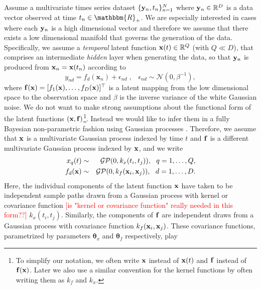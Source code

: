 \documentclass{article} %
\begin{document}
Assume a multivariate times series dataset $\{\mathbf{y}_n,t_n\}_{n=1}^N$
where $\mathbf{y}_n \in \mathbb{R}^D$ is a data vector observed at time 
$t_n \in \mathbbm{R}_+$. We are especially interested in cases where each 
$\mathbf{y}_n$ is a high dimensional vector 
and therefore we assume that there exists a
low dimensional manifold that governs the generation of the data. 
Specifically, we assume a {\em temporal} latent
function $\mathbf{x}(t) \in \mathbb{R}^Q$ (with $Q \ll D$), 
that comprises an intermediate {\em hidden} layer when generating the
data, so that $\mathbf{y}_n$ is produced from $\mathbf{x}_n = \mathbf{x}(t_n)$
according to      
\begin{equation}
\label{generative}
\mathit{y_{nd}} = f_d(\mathbf{x}_n) + \epsilon_{nd} \;, \;\;\; \epsilon_{nd} \sim \mathcal{N}(0, \beta^{-1}),
\end{equation}
where $\mathbf{f}(\mathbf{x}) = [f_1(\mathbf{x}), \ldots, f_D(\mathbf{x})]^{\top}$
is a latent mapping from the low dimensional space to the observation space
and $\beta$ is the inverse variance of the white Gaussian noise. 
We do not want to make strong assumptions about the 
functional form of the latent functions $(\mathbf{x}, \mathbf{f})$\footnote{To
simplify our notation, we often write $\mathbf{x}$ instead of $\mathbf{x}(t)$
and $\mathbf{f}$ instead of $\mathbf{f}(\mathbf{x})$. Later we also use a similar 
convention for the kernel functions by often writing them as $\mathit{k}_f$ and
$\mathit{k}_x$.}. Instead 
we would like to infer them in a fully Bayesian non-parametric
fashion using Gaussian processes \cite{rasmussen-williams}.
Therefore, we assume that $\mathbf{x}$ is a multivariate Gaussian process 
indexed by time $t$ and $\mathbf{f}$ is a different multivariate 
Gaussian process indexed by $\mathbf{x}$, and we write 
\begin{eqnarray}
x_q(t)  & \sim & \mathcal{GP}(0, k_x(t_i,t_j)), \ \ q=1,\ldots,Q, \\     
f_d(\bfx)  & \sim & \mathcal{GP}(0, k_f(\bfx_i,\bfx_j)), \ \ d=1,\ldots,D.
\label{eq:GPpriors}
\end{eqnarray}
Here, the individual components of the latent function $\mathbf{x}$ 
have taken to be independent sample paths drawn from a Gaussian process with kernel or covariance function 
\textcolor{red}{[is "kernel or covariance function" really needed in this form??]}
$k_x(t_i,t_j)$. Similarly, the components of $\mathbf{f}$ are independent 
draws from a Gaussian process with covariance function $k_f(\mathbf{x}_i,\mathbf{x}_j)$. 
These covariance functions, parametrized by parameters 
$\boldsymbol \theta_x$ and $\boldsymbol \theta_f$ respectively,  play 
\end{document}
